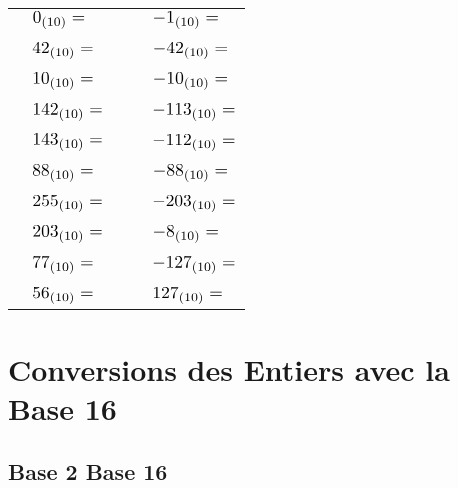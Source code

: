 \documentclass[11pt,a4paper]{article}
\begin{document}
\begin{tabular}{ l l  C{4.5cm}  l l }
  & $ \Scale[1.25]{ 0_{(10)} = } $   & &  & $ \Scale[1.25]{ -1_{(10)} = } $ \\
 & & & & \\
  & $ \Scale[1.25]{ 42_{(10)} = } $  & &  & $ \Scale[1.25]{ -42_{(10)} = } $ \\
 & & & & \\
  & $ \Scale[1.25]{ 10_{(10)} = } $  & &  & $ \Scale[1.25]{ -10_{(10)} = } $ \\
 & & & & \\
  & $ \Scale[1.25]{ 142_{(10)} = } $ & &  & $ \Scale[1.25]{ -113_{(10)} = } $ \\
 & & & & \\
  & $ \Scale[1.25]{ 143_{(10)} = } $ & &  & $ \Scale[1.25]{ -112_{(10)} = } $ \\
 & & & & \\
  & $ \Scale[1.25]{ 88_{(10)} = } $  & &  & $ \Scale[1.25]{ -88_{(10)} = } $ \\
 & & & & \\
  & $ \Scale[1.25]{ 255_{(10)} = } $ & &  & $ \Scale[1.25]{ -203_{(10)} = } $ \\
 & & & & \\
  & $ \Scale[1.25]{ 203_{(10)} = } $ & &  & $ \Scale[1.25]{ -8_{(10)}  = } $ \\
 & & & & \\
  & $ \Scale[1.25]{ 77_{(10)} = } $  & &  & $ \Scale[1.25]{ -127_{(10)}  = } $ \\
 & & & & \\
  & $ \Scale[1.25]{ 56_{(10)} = } $  & &  & $ \Scale[1.25]{ 127_{(10)}  = } $ \\
\end{tabular}

\clearpage


\section{Conversions des Entiers avec la Base 16}


\subsection{Base 2 \textrightarrow{} Base 16}

\smallskip
\end{document}
